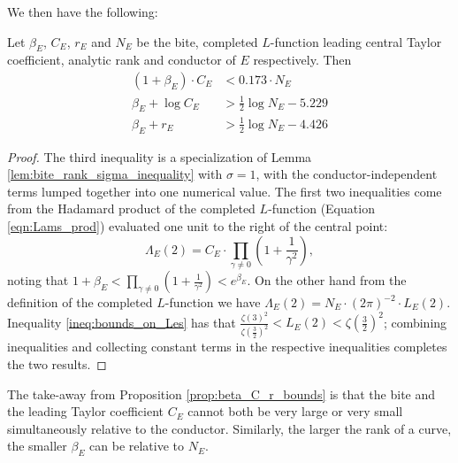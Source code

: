 We then have the following:
\begin{proposition}\label{prop:beta_C_r_bounds}
Let $\beta_E$, $C_E$, $r_E$ and $N_E$ be the bite, completed $L$-function leading central Taylor coefficient, analytic rank and conductor of $E$ respectively. Then
\begin{align}
(1+\beta_E)\cdot C_E & < 0.173 \cdot N_E \\
\beta_E + \log C_E &> \frac{1}{2} \log N_E - 5.229  \\
\beta_E + r_E & > \frac{1}{2} \log N_E - 4.426
\end{align}
\end{proposition}
\begin{proof}
The third inequality is a specialization of Lemma \ref{lem:bite_rank_sigma_inequality} with $\sigma=1$, with the conductor-independent terms lumped together into one numerical value. The first two inequalities come from the Hadamard product of the completed $L$-function (Equation \ref{eqn:Lams_prod}) evaluated one unit to the right of the central point:
\begin{equation}
\Lambda_E(2) = C_E\cdot \prod_{\gamma \ne 0} \left(1+\frac{1}{\gamma^2}\right),
\end{equation}
noting that $1+\beta_E < \prod_{\gamma \ne 0} \left(1+\frac{1}{\gamma^2}\right) < e^{\beta_E}$. On the other hand from the definition of the completed $L$-function we have $\Lambda_E(2) = N_E \cdot (2\pi)^{-2}\cdot  L_E(2)$. Inequality \ref{ineq:bounds_on_Les} has that $\frac{\zeta(3)^2}{\zeta(\frac{3}{2})^2} < L_E(2) < \zeta\left(\frac{3}{2}\right)^2$; combining inequalities and collecting constant terms in the respective inequalities completes the two results.
\end{proof}
The take-away from Proposition \ref{prop:beta_C_r_bounds} is that the bite and the leading Taylor coefficient $C_E$ cannot both be very large or very small simultaneously relative to the conductor. Similarly, the larger the rank of a curve, the smaller $\beta_E$ can be relative to $N_E$. \\

